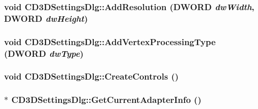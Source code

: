 \label{class_c_d3_d_settings_dlg_a1d0d0f62187b4f88256a866c22755647}
\hypertarget{class_c_d3_d_settings_dlg_ae3b20d440c76b3cb09de3f2e1f3fd4a3}{
\subsubsection[{AddResolution}]{\setlength{\rightskip}{0pt plus 5cm}void CD3DSettingsDlg::AddResolution (DWORD {\em dwWidth}, \/  DWORD {\em dwHeight})}}
\label{class_c_d3_d_settings_dlg_ae3b20d440c76b3cb09de3f2e1f3fd4a3}
\hypertarget{class_c_d3_d_settings_dlg_aa2351f6a7dfaf409b4a1590e4f6c01a8}{
\subsubsection[{AddVertexProcessingType}]{\setlength{\rightskip}{0pt plus 5cm}void CD3DSettingsDlg::AddVertexProcessingType (DWORD {\em dwType})}}
\label{class_c_d3_d_settings_dlg_aa2351f6a7dfaf409b4a1590e4f6c01a8}
\hypertarget{class_c_d3_d_settings_dlg_ab4f8f21e9d8db02fafb03c346cee8eea}{
\subsubsection[{CreateControls}]{\setlength{\rightskip}{0pt plus 5cm}void CD3DSettingsDlg::CreateControls ()}}
\label{class_c_d3_d_settings_dlg_ab4f8f21e9d8db02fafb03c346cee8eea}
\hypertarget{class_c_d3_d_settings_dlg_a541518849e837f4bfead54b3eecfbf6b}{
\subsubsection[{GetCurrentAdapterInfo}]{ $\ast$ CD3DSettingsDlg::GetCurrentAdapterInfo ()}}
